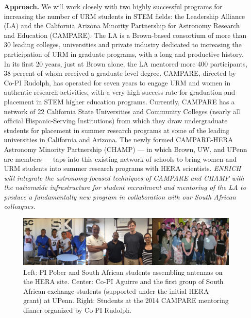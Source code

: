 \documentclass[preprint,11pt]{aastex}
\begin{document}
\vspace{8pt}
\textbf{Approach.} We will work closely with two highly successful programs for increasing the number of URM students in STEM fields: the Leadership Alliance (LA) and the California Arizona Minority Partnership for Astronomy Research and Education (CAMPARE).
The LA is a Brown-based consortium of more than 30 leading colleges, universities and private industry dedicated to increasing the participation of URM in graduate programs, with a long and productive history.  
In its first 20 years, just at Brown alone, the LA mentored more 400 participants, 38 percent of whom received a graduate level degree. CAMPARE, directed by Co-PI Rudolph, has operated for seven years to engage URM and women in authentic research activities, with a very high success rate for graduation and placement in STEM higher education programs.  Currently, CAMPARE has a network of 22 California State Universities and Community Colleges (nearly all official Hispanic-Serving Institutions) from which they draw undergraduate students for placement in summer research programs at some of the leading universities in California and Arizona.  The newly formed CAMPARE-HERA Astronomy Minority Partnership (CHAMP) --- in which Brown, UW, and UPenn are members --- 
taps into this existing network of schools to bring women and URM students into summer research programs with HERA scientists.
\emph{ENRICH will integrate the astronomy-focused techniques of CAMPARE and CHAMP with the nationwide infrastructure for student recruitment and mentoring of the LA to produce a fundamentally new program in collaboration with our South African colleagues.} 

\begin{figure}[!ht]
\centering
\includegraphics{education_fig.pdf}
\caption{Left: PI Pober and South African students assembling antennas on the HERA site.  Center: Co-PI Aguirre and the first group of South African exchange students (supported under the initial HERA grant) at UPenn.  Right: Students at the 2014 CAMPARE mentoring dinner organized by Co-PI Rudolph.}
\label{fig:education}
\end{figure}
\end{document}
